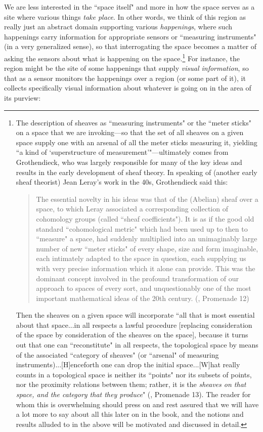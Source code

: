 \documentclass[a4paper]{book}
\theoremstyle{definition}
\theoremstyle{definition}
\theoremstyle{definition}
\theoremstyle{theorem}
\theoremstyle{definition}
\begin{document}
	We are less interested in the ``space itself" and more in how the space serves as a site where various things \textit{take place}. In other words, we think of this region as really just an abstract domain supporting various \textit{happenings}, where such happenings carry information for appropriate sensors or ``measuring instruments" (in a very generalized sense), so that interrogating the space becomes a matter of asking the sensors about what is happening on the space.\footnote{The description of sheaves as ``measuring instruments" or the ``meter sticks" on a space that we are invoking---so that the set of all sheaves on a given space supply one with an arsenal of all the meter sticks measuring it, yielding ``a kind of `superstructure of measurement'"---ultimately comes from Grothendieck, who was largely responsible for many of the key ideas and results in the early development of sheaf theory. In speaking of (another early sheaf theorist) Jean Leray's work in the 40s, Grothendieck said this: 
		\begin{quote}
			The essential novelty in his ideas was that of the (Abelian) sheaf over a space, to which Leray associated a corresponding collection of cohomology groups (called ``sheaf coefficients"). It is as if the good old standard ``cohomological metric" which had been used up to then to ``measure" a space, had suddenly multiplied into an unimaginably large number of new ``meter sticks" of every shape, size and form imaginable, each intimately adapted to the space in question, each supplying us with very precise information which it alone can provide. This was the dominant concept involved in the profound transformation of our approach to spaces of every sort, and unquestionably one of the most important mathematical ideas of the 20th century. (\cite{grothendieck_recoltes_1986}, Promenade 12) 
	\end{quote}
Then the sheaves on a given space will incorporate ``all that is most essential about that space...in all respects a lawful procedure [replacing consideration of the space by consideration of the sheaves on the space], because it turns out that one can ``reconstitute" in all respects, the topological space by means of the associated ``category of sheaves" (or ``arsenal" of measuring instruments)...[H]enceforth one can drop the initial space...[W]hat really counts in a topological space is neither its ``points" nor its subsets of points, nor the proximity relations between them; rather, it is the \textit{sheaves on that space, and the category that they produce}" (\cite{grothendieck_recoltes_1986}, Promenade 13). The reader for whom this is overwhelming should press on and rest assured that we will have a lot more to say about all this later on in the book, and the notions and results alluded to in the above will be motivated and discussed in detail.} For instance, the region might be the site of some happenings that supply \textit{visual information}, so that as a sensor monitors the happenings over a region (or some part of it), it collects specifically visual information about whatever is going on in the area of its purview:   
\end{document}
